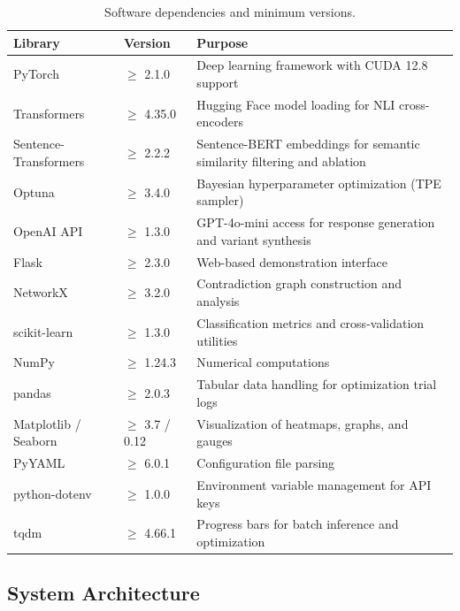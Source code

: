 \begin{table}[!htbp]
    \centering
    \caption{Software dependencies and minimum versions.}
    \label{tab:dependencies}
    \begin{tabular}{llp{7.5cm}}
        \toprule
        \textbf{Library} & \textbf{Version} & \textbf{Purpose} \\
        \midrule
        PyTorch              & $\geq$ 2.1.0   & Deep learning framework with CUDA 12.8 support \\
        Transformers         & $\geq$ 4.35.0  & Hugging Face model loading for NLI cross-encoders \\
        Sentence-Transformers & $\geq$ 2.2.2  & Sentence-BERT embeddings for semantic similarity filtering and ablation \\
        Optuna               & $\geq$ 3.4.0   & Bayesian hyperparameter optimization (TPE sampler) \\
        OpenAI API           & $\geq$ 1.3.0   & GPT-4o-mini access for response generation and variant synthesis \\
        Flask                & $\geq$ 2.3.0   & Web-based demonstration interface \\
        NetworkX             & $\geq$ 3.2.0   & Contradiction graph construction and analysis \\
        scikit-learn         & $\geq$ 1.3.0   & Classification metrics and cross-validation utilities \\
        NumPy                & $\geq$ 1.24.3  & Numerical computations \\
        pandas               & $\geq$ 2.0.3   & Tabular data handling for optimization trial logs \\
        Matplotlib / Seaborn & $\geq$ 3.7 / 0.12 & Visualization of heatmaps, graphs, and gauges \\
        PyYAML               & $\geq$ 6.0.1   & Configuration file parsing \\
        python-dotenv        & $\geq$ 1.0.0   & Environment variable management for API keys \\
        tqdm                 & $\geq$ 4.66.1  & Progress bars for batch inference and optimization \\
        \bottomrule
    \end{tabular}
\end{table}

\subsection{System Architecture}

